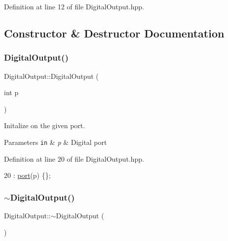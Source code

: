 Definition at line 12 of file Digital\+Output.\+hpp.



\subsection{Constructor \& Destructor Documentation}
\mbox{\label{class_digital_output_a3be20f0faddd50d8f88ed0c620845dba}} 
\subsubsection{\texorpdfstring{Digital\+Output()}{DigitalOutput()}}
{\footnotesize\ttfamily Digital\+Output\+::\+Digital\+Output (\begin{DoxyParamCaption}\item[{int}]{p }\end{DoxyParamCaption})\hspace{0.3cm}{\ttfamily [inline]}}



Initalize on the given port. 


\begin{DoxyParams}[1]{Parameters}
\mbox{\tt in}  & {\em p} & Digital port \\
\hline
\end{DoxyParams}


Definition at line 20 of file Digital\+Output.\+hpp.


\begin{DoxyCode}
20 : \hyperlink{class_digital_output_a01596de4b8252bd9033507e6feea1cb9}{port}(p) \{\};
\end{DoxyCode}
\mbox{\label{class_digital_output_a442e379ebfbd2939d568809dad9c0ba2}} 
\subsubsection{\texorpdfstring{$\sim$\+Digital\+Output()}{~DigitalOutput()}}
{\footnotesize\ttfamily Digital\+Output\+::$\sim$\+Digital\+Output (\begin{DoxyParamCaption}{ }\end{DoxyParamCaption})\hspace{0.3cm}{\ttfamily [inline]}}



